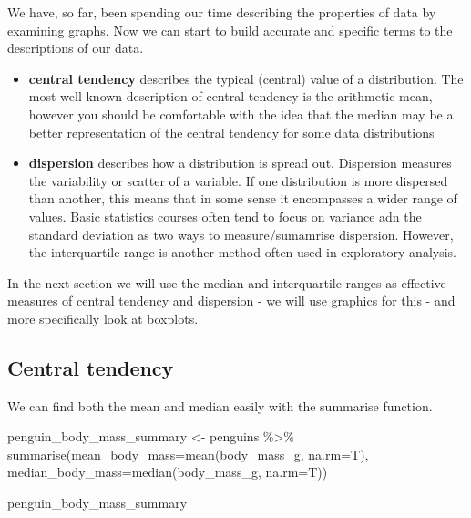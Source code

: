\documentclass[
]{book}
\newenvironment{Shaded}{\begin{snugshade}}{\end{snugshade}}
\newcommand{\AttributeTok}[1]{\textcolor[rgb]{0.77,0.63,0.00}{#1}}
\newcommand{\FunctionTok}[1]{\textcolor[rgb]{0.00,0.00,0.00}{#1}}
\newcommand{\NormalTok}[1]{#1}
\newcommand{\OtherTok}[1]{\textcolor[rgb]{0.56,0.35,0.01}{#1}}
\newcommand{\SpecialCharTok}[1]{\textcolor[rgb]{0.00,0.00,0.00}{#1}}
\begin{document}
We have, so far, been spending our time describing the properties of data by examining graphs. Now we can start to build accurate and specific terms to the descriptions of our data.

\begin{itemize}
\item
  \textbf{central tendency} describes the typical (central) value of a distribution. The most well known description of central tendency is the arithmetic mean, however you should be comfortable with the idea that the median may be a better representation of the central tendency for some data distributions
\item
  \textbf{dispersion} describes how a distribution is spread out. Dispersion measures the variability or scatter of a variable. If one distribution is more dispersed than another, this means that in some sense it encompasses a wider range of values. Basic statistics courses often tend to focus on variance adn the standard deviation as two ways to measure/sumamrise dispersion. However, the interquartile range is another method often used in exploratory analysis.
\end{itemize}

In the next section we will use the median and interquartile ranges as effective measures of central tendency and dispersion - we will use graphics for this - and more specifically look at boxplots.

\hypertarget{central-tendency}{%
\subsection{Central tendency}\label{central-tendency}}

We can find both the mean and median easily with the summarise function.

\begin{Shaded}
\begin{Highlighting}[]
\NormalTok{penguin\_body\_mass\_summary }\OtherTok{\textless{}{-}}\NormalTok{ penguins }\SpecialCharTok{\%\textgreater{}\%} 
  \FunctionTok{summarise}\NormalTok{(}\AttributeTok{mean\_body\_mass=}\FunctionTok{mean}\NormalTok{(body\_mass\_g, }\AttributeTok{na.rm=}\NormalTok{T),}
            \AttributeTok{median\_body\_mass=}\FunctionTok{median}\NormalTok{(body\_mass\_g, }\AttributeTok{na.rm=}\NormalTok{T))}

\NormalTok{penguin\_body\_mass\_summary}
\end{Highlighting}
\end{Shaded}
\end{document}
